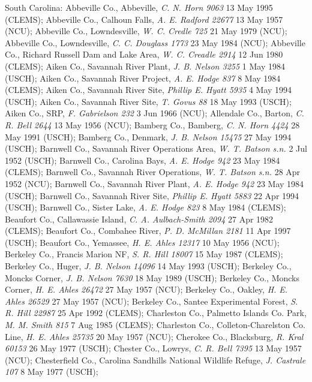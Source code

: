 \documentclass{article}
\begin{document}
South Carolina:
Abbeville Co., Abbeville, \textit{C. N. Horn 9063} 13 May 1995 (CLEMS);
Abbeville Co., Calhoun Falls, \textit{A. E. Radford 22677} 13 May 1957 (NCU);
Abbeville Co., Lowndesville, \textit{W. C. Credle 725} 21 May 1979 (NCU);
Abbeville Co., Lowndesville, \textit{C. C. Douglass 1773} 23 May 1984 (NCU);
Abbeville Co., Richard Russell Dam and Lake Area, \textit{W. C. Creadle 2914} 12 Jun 1980 (CLEMS);
Aiken Co., Savannah River Plant, \textit{J. B. Nelson 3255} 1 May 1984 (USCH);
Aiken Co., Savannah River Project, \textit{A. E. Hodge 837} 8 May 1984 (CLEMS);
Aiken Co., Savannah River Site, \textit{Phillip E. Hyatt 5935} 4 May 1994 (USCH);
Aiken Co., Savannah River Site, \textit{T. Govus 88} 18 May 1993 (USCH);
Aiken Co., SRP, \textit{F. Gabrielson 232} 3 Jun 1966 (NCU);
Allendale Co., Barton, \textit{C. R. Bell 2644} 13 May 1956 (NCU);
Bamberg Co., Bamberg, \textit{C. N. Horn 4424} 28 May 1991 (USCH);
Bamberg Co., Denmark, \textit{J. B. Nelson 15475} 27 May 1994 (USCH);
Barnwell Co., Savannah River Operations Area, \textit{W. T. Batson s.n.} 2 Jul 1952 (USCH);
Barnwell Co., Carolina Bays, \textit{A. E. Hodge 942} 23 May 1984 (CLEMS);
Barnwell Co., Savannah River Operations, \textit{W. T. Batson s.n.} 28 Apr 1952 (NCU);
Barnwell Co., Savannah River Plant, \textit{A. E. Hodge 942} 23 May 1984 (USCH);
Barnwell Co., Savannah River Site, \textit{Phillip E. Hyatt 5883} 22 Apr 1994 (USCH);
Barnwell Co., Sister Lake, \textit{A. E. Hodge 823} 8 May 1984 (CLEMS);
Beaufort Co., Callawassie Island, \textit{C. A. Aulbach-Smith 2094} 27 Apr 1982 (CLEMS);
Beaufort Co., Combahee River, \textit{P. D. McMillan 2181} 11 Apr 1997 (USCH);
Beaufort Co., Yemassee, \textit{H. E. Ahles 12317} 10 May 1956 (NCU);
Berkeley Co., Francis Marion NF, \textit{S. R. Hill 18007} 15 May 1987 (CLEMS);
Berkeley Co., Huger, \textit{J. B. Nelson 14096} 14 May 1993 (USCH);
Berkeley Co., Moncks Corner, \textit{J. B. Nelson 7630} 18 May 1989 (USCH);
Berkeley Co., Moncks Corner, \textit{H. E. Ahles 26472} 27 May 1957 (NCU);
Berkeley Co., Oakley, \textit{H. E. Ahles 26529} 27 May 1957 (NCU);
Berkeley Co., Santee Experimental Forest, \textit{S. R. Hill 22987} 25 Apr 1992 (CLEMS);
Charleston Co., Palmetto Islands Co. Park, \textit{M. M. Smith 815} 7 Aug 1985 (CLEMS);
Charleston Co., Colleton-Charelston Co. Line, \textit{H. E. Ahles 25735} 20 May 1957 (NCU);
Cherokee Co., Blacksburg, \textit{R. Kral 60153} 26 May 1977 (USCH);
Chester Co., Lowrys, \textit{C. R. Bell 7395} 13 May 1957 (NCU);
Chesterfield Co., Carolina Sandhills National Wildlife Refuge, \textit{J. Castrale 107} 8 May 1977 (USCH);
\end{document}
